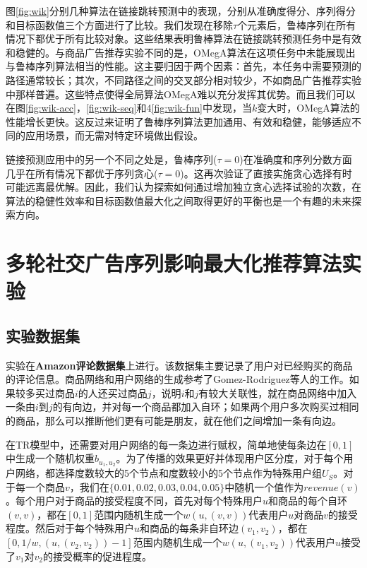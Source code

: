 图\ref{fig:wik}分别几种算法在链接跳转预测中的表现，分别从准确度得分、序列得分和目标函数值三个方面进行了比较。我们发现在移除$\tau$个元素后，鲁棒序列在所有情况下都优于所有比较对象。这些结果表明鲁棒算法在链接跳转预测任务中是有效和稳健的。与商品广告推荐实验不同的是，OMegA算法在这项任务中未能展现出与鲁棒序列算法相当的性能。这主要归因于两个因素：首先，本任务中需要预测的路径通常较长；其次，不同路径之间的交叉部分相对较少，不如商品广告推荐实验中那样普遍。这些特点使得全局算法OMegA难以充分发挥其优势。而且我们可以在图\ref{fig:wik-acc}，\ref{fig:wik-seq}和4\ref{fig:wik-fun}中发现，当$k$变大时，OMegA算法的性能增长更快。这反过来证明了鲁棒序列算法更加通用、有效和稳健，能够适应不同的应用场景，而无需对特定环境做出假设。

链接预测应用中的另一个不同之处是，鲁棒序列($\tau=0$)在准确度和序列分数方面几乎在所有情况下都优于序列贪心($\tau=0$)。这再次验证了直接实施贪心选择有时可能远离最优解。因此，我们认为探索如何通过增加独立贪心选择试验的次数，在算法的稳健性效率和目标函数值最大化之间取得更好的平衡也是一个有趣的未来探索方向。



\section{多轮社交广告序列影响最大化推荐算法实验}
\label{sec:5_2}

\subsection{实验数据集}

实验在{\bfseries Amazon评论数据集}\cite{amazon24}上进行。该数据集主要记录了用户对已经购买的商品的评论信息。商品网络和用户网络的生成参考了Gomez-Rodriguez等人\cite{netgen}的工作。如果较多买过商品$i$的人还买过商品$j$，说明$i$和$j$有较大关联性，就在商品网络中加入一条由$i$到$j$的有向边，并对每一个商品都加入自环；如果两个用户多次购买过相同的商品，那么可以推断他们更有可能是朋友，就在他们之间增加一条有向边。

在TR模型中，还需要对用户网络的每一条边进行赋权，简单地使每条边在$[0,1]$中生成一个随机权重$b_{u_1,u_2}$。为了传播的效果更好并体现用户区分度，对于每个用户网络，都选择度数较大的5个节点和度数较小的5个节点作为特殊用户组$U_S$。对于每一个商品$v$，我们在$\{0.01,0.02,0.03,0.04,0.05\}$中随机一个值作为$revenue(v)$。每个用户对于商品的接受程度不同，首先对每个特殊用户$u$和商品的每个自环$(v,v)$，都在$[0,1]$范围内随机生成一个$w(u,(v,v))$代表用户$u$对商品$v$的接受程度。然后对于每个特殊用户$u$和商品的每条非自环边$(v_1,v_2)$，都在$[0,1/w,(u,(v_2,v_2))-1]$范围内随机生成一个$w(u,(v_1,v_2))$代表用户$u$接受了$v_1$对$v_2$的接受概率的促进程度。

